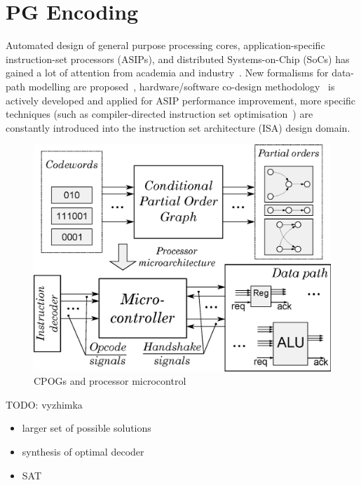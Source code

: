 \section{PG Encoding}

Automated design of general purpose processing cores, application-specific
instruction-set processors (ASIPs), and distributed Systems-on-Chip
(SoCs) has gained a lot of attention from academia and industry~\cite{2006_dutt_chapter}.
New formalisms for data-path modelling are proposed~\cite{2010_mokhov_ieee}\cite{2008_sokolov_sdfs},
hardware/software co-design methodology~\cite{1993_alomary_edac}
is actively developed and applied for ASIP performance improvement,
more specific techniques (such as compiler-directed instruction set
optimisation~\cite{2002_qin_date}) are constantly introduced into
the instruction set architecture (ISA) design domain.

\begin{figure}
\begin{centering}
\vspace{-3mm}
\includegraphics[width=0.6\columnwidth]{fig/control}\vspace{-1mm}

\par\end{centering}

\caption{CPOGs and processor microcontrol\label{fig:Dynamically-reconfigurable-controller}}
\vspace{-3mm}
\end{figure}

{\huge{
TODO: vyzhimka
\begin{itemize}
\item larger set of possible solutions
\item synthesis of optimal decoder
\item SAT
\end{itemize}
}}

